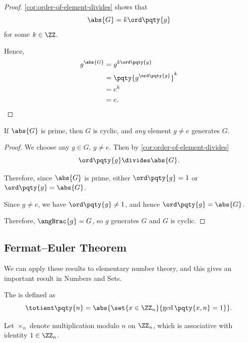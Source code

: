 \begin{proof}
    \autoref{cor:order-of-element-divides} shows that
    \[
        \abs{G} = k \ord \pqty{g}
    \]
    for some \(k \in \ZZ\).

    Hence,
    \begin{align*}
        g^{\abs{G}} &= g^{k \ord \pqty{g}} \\
        &= \pqty{g^{\ord \pqty{g}}}^{k} \\
        &= e^k \\
        &= e.
    \end{align*}
\end{proof}

\begin{corollary}
    \label{cor:group-prime-order}%
    If \(\abs{G}\) is prime, then \(G\) is cyclic, and \emph{any} element \(g \neq e\) generates \(G\).
\end{corollary}

\begin{proof}
    We choose any \(g \in G\), \(g \neq e\). Then by \autoref{cor:order-of-element-divides}
    \[
        \ord \pqty{g} \divides \abs{G}.
    \]

    Therefore, since \(\abs{G}\) is prime, either \(\ord \pqty{g} = 1\) or \(\ord \pqty{g} = \abs{G}\).

    Since \(g \neq e\), we have \(\ord \pqty{g} \neq 1\), and hence \(\ord \pqty{g} = \abs{G}\).

    Therefore, \(\angBrac{g} = G\), so \(g\) generates \(G\) and \(G\) is cyclic.
\end{proof}

\subsection{Fermat--Euler Theorem}
\label{sec:femat-euler}

We can apply these results to elementary number theory, and this gives an important result in Numbers and Sets.

\begin{definition}
    \label{def:euler-totient}%
    The  is defined as
    \[
        \totient\pqty{n} = \abs{\set{x \in \ZZ_{n}}{\gcd\pqty{x, n} = 1}}.
    \]
\end{definition}

Let \(\times_{n}\) denote multiplication modulo \(n\) on \(\ZZ_n\), which is associative with identity \(1 \in \ZZ_n\).


